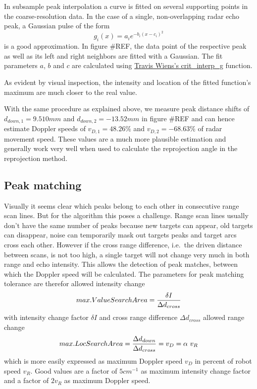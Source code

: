 In subsample peak interpolation a curve is fitted on several supporting
points in the coarse-resolution data. In the case of a single,
non-overlapping radar echo peak, a Gaussian pulse of the form
\[g_i(x) = a_i e^{-b_i ( x - c_i )^2}\] is a good approximation. In
figure \#REF, the data point of the respective peak as well as its left
and right neighbors are fitted with a Gaussian. The fit parameters
\(a\), \(b\) and \(c\) are calculated using
\href{https://www.mathworks.com/matlabcentral/fileexchange/24465}{Travis
Wiens's crit\_interp\_g} function.

As evident by visual inspection, the intensity and location of the
fitted function's maximum are much closer to the real value.

With the same procedure as explained above, we measure peak distance
shifts of \(d_{down,1}=9.510mm\) and \(d_{down,2}=-13.52mm\) in figure
\#REF and can hence estimate Doppler speeds of \(v_{D,1}=48.26\%\) and
\(v_{D,2}=-68.63\%\) of radar movement speed. These values are a much
more plausible estimation and generally work very well when used to
calculate the reprojection angle in the reprojection method.

\subsection{Peak matching}\label{peak-matching}

Visually it seems clear which peaks belong to each other in consecutive
range scan lines. But for the algorithm this poses a challenge. Range
scan lines usually don't have the same number of peaks because new
targets can appear, old targets can disappear, noise can temporarily
mask out targets peaks and target arcs cross each other. However if the
cross range difference, i.e.~the driven distance between scans, is not
too high, a single target will not change very much in both range and
echo intensity. This allows the detection of peak matches, between which
the Doppler speed will be calculated. The parameters for peak matching
tolerance are therefor allowed intensity change
\[max. ValueSearchArea = {\delta I\over{\Delta d_{cross}}}\] with
intensity change factor \(\delta I\) and cross range difference
\(\Delta d_{cross}\) allowed range change
\[max. LocSearchArea = {\Delta d_{down}\over{\Delta d_{cross}}} = v_D = \alpha~v_R\]
which is more easily expressed as maximum Doppler speed \(v_D\) in
percent of robot speed \(v_R\). Good values are a factor of
\(5 cm^{-1}\) as maximum intensity change factor and a factor of
\(2 v_R\) as maximum Doppler speed.

